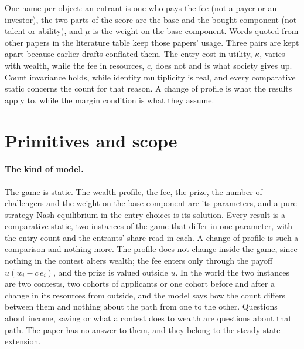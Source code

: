 One name per object: an entrant is one who pays the fee (not a payer or an
investor), the two parts of the score are the base and the bought component
(not talent or ability), and $\mu$ is the weight on the base component. Words
quoted from other papers in the literature table keep those papers' usage.
Three pairs are kept apart because earlier drafts conflated them. The entry
cost in utility, $\kappa$, varies with wealth, while the fee in resources, $c$,
does not and is what society gives up. Count invariance holds, while identity
multiplicity is real, and every comparative static concerns the count for that
reason. A change of profile is what the results apply to, while the margin
condition is what they assume.

\section{Primitives and scope}
\label{app:primitives}

\paragraph{The kind of model.} The game is static. The wealth profile, the
fee, the prize, the number of challengers and the weight on the base component
are its parameters, and a pure-strategy Nash equilibrium in the entry choices
is its solution. Every result is a comparative static, two instances of the
game that differ in one parameter, with the entry count and the entrants'
share read in each. A change of profile is such a comparison and nothing more.
The profile does not change inside the game, since nothing in the contest
alters wealth; the fee enters only through the payoff $u(w_i-c\,e_i)$, and the
prize is valued outside $u$. In the world the two instances are two contests,
two cohorts of applicants or one cohort before and after a change in its
resources from outside, and the model says how the count differs between them
and nothing about the path from one to the other. Questions about income,
saving or what a contest does to wealth are questions about that path. The
paper has no answer to them, and they belong to the steady-state extension.

